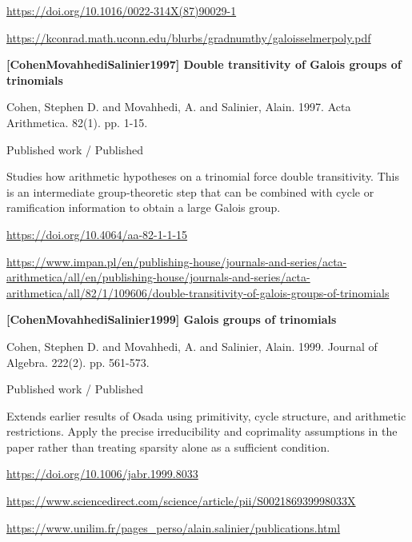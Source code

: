 \documentclass[11pt,a4paper,oneside,openany]{book}
\begin{document}
{\footnotesize\url{https://doi.org/10.1016/0022-314X(87)90029-1}}\par
{\footnotesize\url{https://kconrad.math.uconn.edu/blurbs/gradnumthy/galoisselmerpoly.pdf}}\par
\vspace{9pt}
\hypertarget{ref:CohenMovahhediSalinier1997}{}
{\sffamily\bfseries\color{atlasgreen}[CohenMovahhediSalinier1997] Double transitivity of Galois groups of trinomials}\par
\color{black} Cohen, Stephen D. and Movahhedi, A. and Salinier, Alain. 1997. Acta Arithmetica. 82(1). pp. 1-15.\par
{\small\sffamily\color{atlasgold}Published work / Published}\par
\color{black} Studies how arithmetic hypotheses on a trinomial force double transitivity. This is an intermediate group-theoretic step that can be combined with cycle or ramification information to obtain a large Galois group.\par
{\footnotesize\url{https://doi.org/10.4064/aa-82-1-1-15}}\par
{\footnotesize\url{https://www.impan.pl/en/publishing-house/journals-and-series/acta-arithmetica/all/en/publishing-house/journals-and-series/acta-arithmetica/all/82/1/109606/double-transitivity-of-galois-groups-of-trinomials}}\par
\vspace{9pt}
\hypertarget{ref:CohenMovahhediSalinier1999}{}
{\sffamily\bfseries\color{atlasgreen}[CohenMovahhediSalinier1999] Galois groups of trinomials}\par
\color{black} Cohen, Stephen D. and Movahhedi, A. and Salinier, Alain. 1999. Journal of Algebra. 222(2). pp. 561-573.\par
{\small\sffamily\color{atlasgold}Published work / Published}\par
\color{black} Extends earlier results of Osada using primitivity, cycle structure, and arithmetic restrictions. Apply the precise irreducibility and coprimality assumptions in the paper rather than treating sparsity alone as a sufficient condition.\par
{\footnotesize\url{https://doi.org/10.1006/jabr.1999.8033}}\par
{\footnotesize\url{https://www.sciencedirect.com/science/article/pii/S002186939998033X}}\par
{\footnotesize\url{https://www.unilim.fr/pages_perso/alain.salinier/publications.html}}\par
\end{document}

